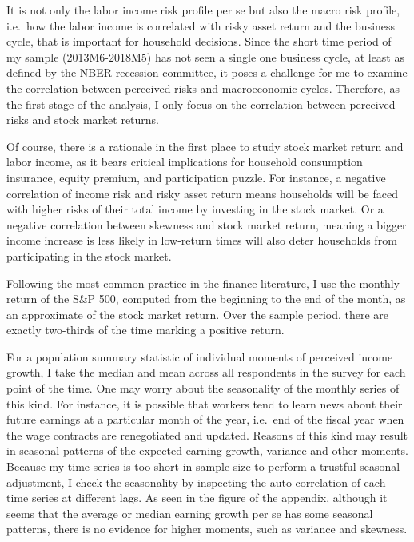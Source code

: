 \documentclass[12pt,notitlepage,onecolumn,aps,pra]{revtex4-1}
\begin{document}
It is not only the labor income risk profile per se but also the macro
risk profile, i.e.~how the labor income is correlated with risky asset
return and the business cycle, that is important for household
decisions. Since the short time period of my sample (2013M6-2018M5) has
not seen a single one business cycle, at least as defined by the NBER
recession committee, it poses a challenge for me to examine the
correlation between perceived risks and macroeconomic cycles. Therefore,
as the first stage of the analysis, I only focus on the correlation
between perceived risks and stock market returns.

Of course, there is a rationale in the first place to study stock market
return and labor income, as it bears critical implications for household
consumption insurance, equity premium, and participation puzzle. For
instance, a negative correlation of income risk and risky asset return
means households will be faced with higher risks of their total income
by investing in the stock market. Or a negative correlation between
skewness and stock market return, meaning a bigger income increase is
less likely in low-return times will also deter households from
participating in the stock market.

Following the most common practice in the finance literature, I use the
monthly return of the S\&P 500, computed from the beginning to the end
of the month, as an approximate of the stock market return. Over the
sample period, there are exactly two-thirds of the time marking a
positive return.

For a population summary statistic of individual moments of perceived
income growth, I take the median and mean across all respondents in the
survey for each point of the time. One may worry about the seasonality
of the monthly series of this kind. For instance, it is possible that
workers tend to learn news about their future earnings at a particular
month of the year, i.e.~end of the fiscal year when the wage contracts
are renegotiated and updated. Reasons of this kind may result in
seasonal patterns of the expected earning growth, variance and other
moments. Because my time series is too short in sample size to perform a
trustful seasonal adjustment, I check the seasonality by inspecting the
auto-correlation of each time series at different lags. As seen in the
figure of the appendix, although it seems that the average or median
earning growth per se has some seasonal patterns, there is no evidence
for higher moments, such as variance and skewness.
\end{document}

